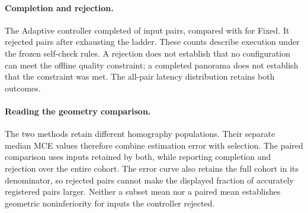 \providecommand{\ControllerEvidenceDir}{../results/p3-de-t4-20261102/final-checkpoint/report}



\paragraph{Completion and rejection.}
The Adaptive controller completed \ControllerCompleted{} of
\ControllerPairs{} input pairs, compared with \FixedCompleted{} for Fixed.
It rejected \ControllerBudgetRejected{} pairs after exhausting the ladder.
These counts describe execution under the frozen self-check rules.
A rejection does not establish that no configuration can meet the offline
quality constraint; a completed panorama does not establish that the
constraint was met. The all-pair latency distribution retains both outcomes.

\paragraph{Reading the geometry comparison.}
The two methods retain different homography populations. Their separate
median MCE values therefore combine estimation error with selection.
The paired comparison uses \GeometryJointPairs{} inputs retained by both,
while reporting completion and rejection over the entire cohort.
The error curve also retains the full cohort in its denominator, so rejected
pairs cannot make the displayed fraction of accurately registered pairs larger.
Neither a subset mean nor a paired mean establishes geometric noninferiority
for inputs the controller rejected.
